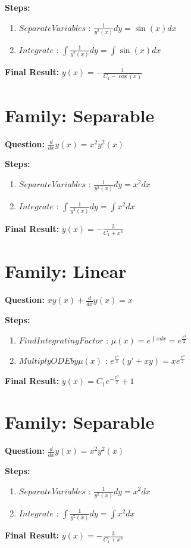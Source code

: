 \documentclass{article}
\begin{document}
\textbf{Steps:}
\begin{enumerate}
\item $Separate Variables$ :  $\frac{1}{y^{2}{\left(x \right)}} dy = \sin{\left(x \right)} dx$
\item $Integrate$ :  $\int \frac{1}{y^{2}{\left(x \right)}} dy = \int \sin{\left(x \right)} dx$
\end{enumerate}
\textbf{Final Result:} $y{\left(x \right)} = - \frac{1}{C_{1} - \cos{\left(x \right)}}$

\section*{Family: Separable}
\textbf{Question:} $\frac{d}{d x} y{\left(x \right)} = x^{2} y^{2}{\left(x \right)}$

\textbf{Steps:}
\begin{enumerate}
\item $Separate Variables$ :  $\frac{1}{y^{2}{\left(x \right)}} dy = x^{2} dx$
\item $Integrate$ :  $\int \frac{1}{y^{2}{\left(x \right)}} dy = \int x^{2} dx$
\end{enumerate}
\textbf{Final Result:} $y{\left(x \right)} = - \frac{3}{C_{1} + x^{3}}$

\section*{Family: Linear}
\textbf{Question:} $x y{\left(x \right)} + \frac{d}{d x} y{\left(x \right)} = x$

\textbf{Steps:}
\begin{enumerate}
\item $Find Integrating Factor$ :  $\mu(x) = e^{\int x dx} = e^{\frac{x^{2}}{2}}$
\item $Multiply ODE by \mu(x)$ :  $e^{\frac{x^{2}}{2}}(y' + xy) = x e^{\frac{x^{2}}{2}}$
\end{enumerate}
\textbf{Final Result:} $y{\left(x \right)} = C_{1} e^{- \frac{x^{2}}{2}} + 1$

\section*{Family: Separable}
\textbf{Question:} $\frac{d}{d x} y{\left(x \right)} = x^{2} y^{2}{\left(x \right)}$

\textbf{Steps:}
\begin{enumerate}
\item $Separate Variables$ :  $\frac{1}{y^{2}{\left(x \right)}} dy = x^{2} dx$
\item $Integrate$ :  $\int \frac{1}{y^{2}{\left(x \right)}} dy = \int x^{2} dx$
\end{enumerate}
\textbf{Final Result:} $y{\left(x \right)} = - \frac{3}{C_{1} + x^{3}}$
\end{document}
